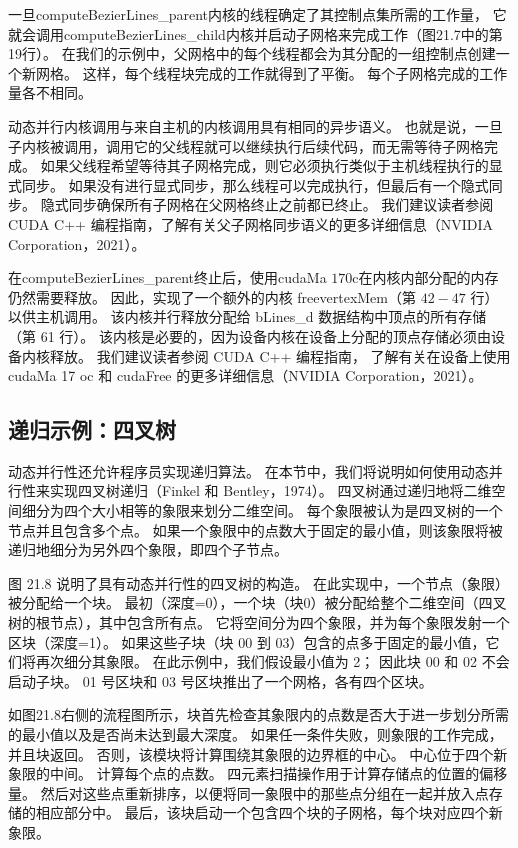 一旦computeBezierLines\_parent内核的线程确定了其控制点集所需的工作量，
它就会调用computeBezierLines\_child内核并启动子网格来完成工作（图21.7中的第19行）。 
在我们的示例中，父网格中的每个线程都会为其分配的一组控制点创建一个新网格。 这样，每个线程块完成的工作就得到了平衡。 
每个子网格完成的工作量各不相同。

动态并行内核调用与来自主机的内核调用具有相同的异步语义。 
也就是说，一旦子内核被调用，调用它的父线程就可以继续执行后续代码，而无需等待子网格完成。 
如果父线程希望等待其子网格完成，则它必须执行类似于主机线程执行的显式同步。 
如果没有进行显式同步，那么线程可以完成执行，但最后有一个隐式同步。 隐式同步确保所有子网格在父网格终止之前都已终止。 
我们建议读者参阅 CUDA C++ 编程指南，了解有关父子网格同步语义的更多详细信息（NVIDIA Corporation，2021）。

在computeBezierLines\_parent终止后，使用cudaMa $170 \mathrm{c}$在内核内部分配的内存仍然需要释放。 
因此，实现了一个额外的内核 freevertexMem（第 $42-47$ 行）以供主机调用。 
该内核并行释放分配给 bLines\_d 数据结构中顶点的所有存储（第 61 行）。 
该内核是必要的，因为设备内核在设备上分配的顶点存储必须由设备内核释放。 
我们建议读者参阅 CUDA C++ 编程指南，
了解有关在设备上使用 cudaMa 17 oc 和 cudaFree 的更多详细信息（NVIDIA Corporation，2021）。

\subsection{递归示例：四叉树}
动态并行性还允许程序员实现递归算法。 在本节中，我们将说明如何使用动态并行性来实现四叉树递归（Finkel 和 Bentley，1974）。 
四叉树通过递归地将二维空间细分为四个大小相等的象限来划分二维空间。 每个象限被认为是四叉树的一个节点并且包含多个点。 
如果一个象限中的点数大于固定的最小值，则该象限将被递归地细分为另外四个象限，即四个子节点。

图 21.8 说明了具有动态并行性的四叉树的构造。 在此实现中，一个节点（象限）被分配给一个块。 
最初（深度=0），一个块（块0）被分配给整个二维空间（四叉树的根节点），其中包含所有点。 
它将空间分为四个象限，并为每个象限发射一个区块（深度=1）。 
如果这些子块（块 00 到 03）包含的点多于固定的最小值，它们将再次细分其象限。 
在此示例中，我们假设最小值为 2； 因此块 00 和 02 不会启动子块。 01 号区块和 03 号区块推出了一个网格，各有四个区块。

如图21.8右侧的流程图所示，块首先检查其象限内的点数是否大于进一步划分所需的最小值以及是否尚未达到最大深度。 
如果任一条件失败，则象限的工作完成，并且块返回。 否则，该模块将计算围绕其象限的边界框的中心。 中心位于四个新象限的中间。 
计算每个点的点数。 四元素扫描操作用于计算存储点的位置的偏移量。 
然后对这些点重新排序，以便将同一象限中的那些点分组在一起并放入点存储的相应部分中。 
最后，该块启动一个包含四个块的子网格，每个块对应四个新象限。

